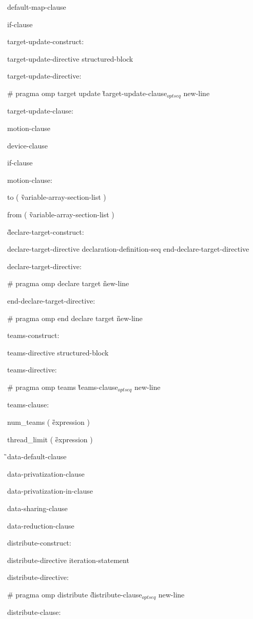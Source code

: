 {\I default-map-clause

\I if-clause

target-update-construct:

\I target-update-directive structured-block

target-update-directive:

\C\I \# pragma omp target update \G target-update-clause$_{optseq}$ new-line

target-update-clause:

\I motion-clause

\I device-clause

\I if-clause

motion-clause:

\C\I to ( \G variable-array-section-list \C )

\C\I from ( \G variable-array-section-list \C )

\G declare-target-construct:

\I declare-target-directive declaration-definition-seq end-declare-target-directive

declare-target-directive:

\C\I \# pragma omp declare target \G new-line

end-declare-target-directive:

\C\I \# pragma omp end declare target \G new-line

teams-construct:

\I teams-directive structured-block

teams-directive:

\C\I \# pragma omp teams \G teams-clause$_{optseq}$ new-line

teams-clause:

\C\I num\_teams ( \G expression \C )

\C\I thread\_limit ( \G expression \C )

\G\I data-default-clause

\I data-privatization-clause

\I data-privatization-in-clause

\I data-sharing-clause

\I data-reduction-clause

distribute-construct:

\I distribute-directive iteration-statement

distribute-directive:

\C\I \# pragma omp distribute \G distribute-clause$_{optseq}$ new-line

distribute-clause:

}
